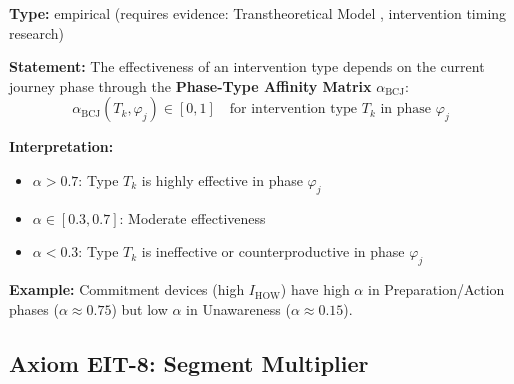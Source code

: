 \begin{tcolorbox}[colback=blue!5!white, colframe=blue!75!black,
    title=\textbf{Axiom EIT-7: Phase-Type Affinity}]

\textbf{Type:} empirical (requires evidence: Transtheoretical Model \citep{prochaska1992stages}, intervention timing research)

\textbf{Statement:} The effectiveness of an intervention type depends on the current journey phase through the \textbf{Phase-Type Affinity Matrix} $\alpha_{\text{BCJ}}$:
\begin{equation}
\boxed{\alpha_{\text{BCJ}}(T_k, \varphi_j) \in [0,1] \quad \text{for intervention type } T_k \text{ in phase } \varphi_j}
\label{eq:ie-phase-affinity}
\end{equation}

\textbf{Interpretation:}
\begin{itemize}[nosep]
    \item $\alpha > 0.7$: Type $T_k$ is highly effective in phase $\varphi_j$
    \item $\alpha \in [0.3, 0.7]$: Moderate effectiveness
    \item $\alpha < 0.3$: Type $T_k$ is ineffective or counterproductive in phase $\varphi_j$
\end{itemize}

\textbf{Example:} Commitment devices (high $I_{\text{HOW}}$) have high $\alpha$ in Preparation/Action phases ($\alpha \approx 0.75$) but low $\alpha$ in Unawareness ($\alpha \approx 0.15$).

\end{tcolorbox}

\subsection{Axiom EIT-8: Segment Multiplier}


